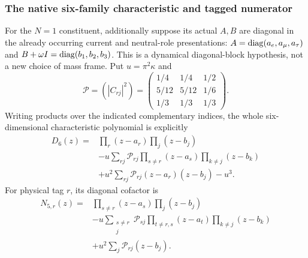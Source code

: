 \documentclass[11pt,a4paper]{article}
\begin{document}
\subsubsection{The native six-family characteristic and tagged numerator}
For the $N=1$ constituent, additionally suppose its actual $A,B$ are diagonal
in the already occurring current and neutral-role presentations:
$A=\operatorname{diag}(a_e,a_\mu,a_\tau)$ and
$B+\omega I=\operatorname{diag}(b_1,b_2,b_3)$. This is a dynamical diagonal-block
hypothesis, not a new choice of mass frame. Put $u=\pi^2\kappa$ and
\[
 \mathcal P=(|C_{rj}|^2)=
 \begin{pmatrix}1/4&1/4&1/2\\5/12&5/12&1/6\\1/3&1/3&1/3\end{pmatrix}.
\]
Writing products over the indicated complementary indices, the whole
six-dimensional characteristic polynomial is explicitly
\begin{equation}
 \boxed{\begin{aligned}
 D_6(z)={}&\prod_r(z-a_r)\prod_j(z-b_j)\\
 &-u\sum_{rj}\mathcal P_{rj}
             \prod_{s\ne r}(z-a_s)\prod_{k\ne j}(z-b_k)\\
 &+u^2\sum_{rj}\mathcal P_{rj}(z-a_r)(z-b_j)-u^3 .
 \end{aligned}} \label{p5c:eq:v2169-b13-o6}
\end{equation}
For physical tag $r$, its diagonal cofactor is
\begin{equation}
 \boxed{\begin{aligned}
 N_{5,r}(z)={}&\prod_{s\ne r}(z-a_s)\prod_j(z-b_j)\\
 &-u\sum_{\substack{s\ne r\\j}}\mathcal P_{sj}
             \prod_{t\ne r,s}(z-a_t)\prod_{k\ne j}(z-b_k)\\
 &+u^2\sum_j\mathcal P_{rj}(z-b_j).
 \end{aligned}} \label{p5c:eq:v2169-b13-o7}
\end{equation}
\end{document}
